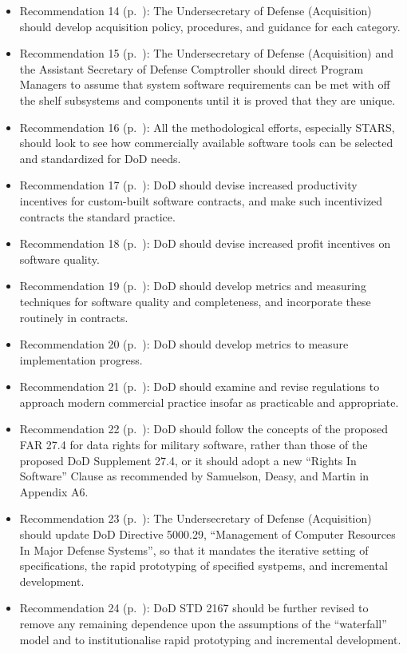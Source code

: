 \documentclass[12pt,final]{article}
\begin{document}
\begin{itemize}
    \item Recommendation 14 (p.~\pageref{rec:14}): The Undersecretary of Defense (Acquisition) should develop acquisition policy, procedures, and guidance for each category.
    \item Recommendation 15 (p.~\pageref{rec:15}): The Undersecretary of Defense (Acquisition) and the Assistant Secretary of Defense Comptroller should direct Program Managers to assume that system software requirements can be met with off the shelf subsystems and components until it is proved that they are unique.
    \item Recommendation 16 (p.~\pageref{rec:16}): All the methodological efforts, especially STARS, should look to see how commercially available software tools can be selected and standardized for DoD needs.
    \item Recommendation 17 (p.~\pageref{rec:17}): DoD should devise increased productivity incentives for custom-built software contracts, and make such incentivized contracts the standard practice.
    \item Recommendation 18 (p.~\pageref{rec:18}): DoD should devise increased profit incentives on software quality.
    \item Recommendation 19 (p.~\pageref{rec:19}): DoD should develop metrics and measuring techniques for software quality and completeness, and incorporate these routinely in contracts.
    \item Recommendation 20 (p.~\pageref{rec:20}): DoD should develop metrics to measure implementation progress.
    \item Recommendation 21 (p.~\pageref{rec:21}): DoD should examine and revise regulations to approach modern commercial practice insofar as practicable and appropriate.
    \item Recommendation 22 (p.~\pageref{rec:22}): DoD should follow the concepts of the proposed FAR 27.4 for data rights for military software, rather than those of the proposed DoD Supplement 27.4, or it should adopt a new “Rights In Software” Clause as recommended by Samuelson, Deasy, and Martin in Appendix A6.
    \item Recommendation 23 (p.~\pageref{rec:23}): The Undersecretary of Defense (Acquisition) should update DoD Directive 5000.29, “Management of Computer Resources In Major Defense Systems”, so that it mandates the iterative setting of specifications, the rapid prototyping of specified systpems, and incremental development.
    \item Recommendation 24 (p.~\pageref{rec:24}): DoD STD 2167 should be further revised to remove any remaining dependence upon the assumptions of the “waterfall” model and to institutionalise rapid prototyping and incremental development.

\end{itemize}
\end{document}
